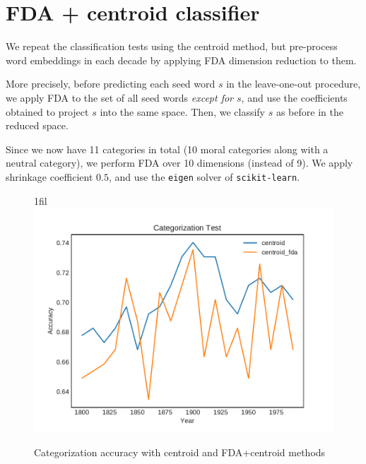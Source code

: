 \documentclass{article}
\makeatletter
\newcommand*{\centerfloat}{%
  \parindent \z@
  \leftskip \z@ \@plus 1fil \@minus \textwidth
  \rightskip\leftskip
  \parfillskip \z@skip}
\makeatother
\begin{document}
\section{FDA + centroid classifier}

We repeat the classification tests using the centroid method, but pre-process
word embeddings in each decade by applying FDA dimension reduction to them.

More precisely, before predicting each seed word $s$ in the leave-one-out
procedure, we apply FDA to the set of all seed words \textit{except for $s$},
and use the coefficients obtained to project $s$ into the same space. Then,
we classify $s$ as before in the reduced space.

Since we now have 11 categories in total (10 moral categories along with a
neutral category), we perform FDA over 10 dimensions (instead of 9).
We apply shrinkage coefficient $0.5$, and use the \texttt{eigen} solver of
\texttt{scikit-learn}.

\begin{figure}[H]
    \centerfloat
    \includegraphics[width=1.5\linewidth]{centroid-fda-vs-not-fixed-seeds/results_categorization_test.pdf}
    \caption{Categorization accuracy with centroid and FDA+centroid methods}
    \label{fig:fda-categorization}
\end{figure}
\end{document}
